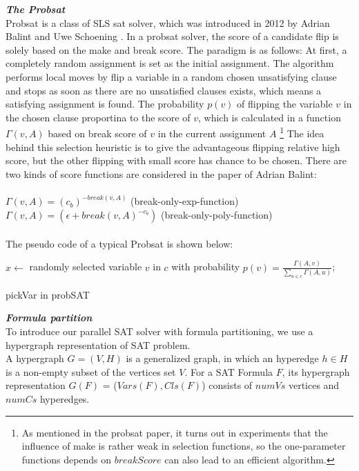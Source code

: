 \documentclass[12pt,a4paper,twoside]{scrartcl}
\numberwithin{equation}{section}
\begin{document}
\emph{\textbf{The Probsat}}\\
Probsat is a class of SLS sat solver, which was introduced in 2012 by Adrian Balint and Uwe Schoening \cite{balint2016engineering}. In a probsat solver, the score of a candidate flip is solely based on the make and break score. The paradigm is as follows: At first, a completely random assignment is set as the initial assignment. The algorithm performs local moves by flip a variable in a random chosen unsatisfying clause and stops as soon as there are no unsatisfied clauses exists, which means a satisfying assignment is found. The probability $p(v)$ of flipping the variable $v$ in the chosen clause proportina to the score of $v$, which is calculated in a function $\Gamma(v,A)$ based on break score of $v$ in the current assignment $A$ \footnote{As mentioned in the probsat paper, it turns out in experiments that the influence of make is rather weak in selection functions, so the one-parameter functions depends on $breakScore$ can also lead to an efficient algorithm.} The idea behind this selection heuristic is to give the advantageous flipping relative high score, but the other flipping with small score has chance to be chosen.  There are two kinds of score functions are considered in the paper of Adrian Balint: \\
\\
$\Gamma(v,A) = (c_b)^{-break(v,A)}$ (break-only-exp-function) \\
$\Gamma(v,A)=(\epsilon +break(v,A)^{-c_b})$  (break-only-poly-function)\\ 
\\
\clearpage
The pseudo code of a typical Probsat is shown below:\\
\begin{algorithm}[H]
  $x \leftarrow$ randomly selected  variable $v$ in $c$ with probability $p(v) =\frac{\Gamma(A,v)}{\sum_{u \in c}\Gamma(A,u)}$; 
 \caption{pickVar in probSAT}
\end{algorithm} 
\emph{\textbf{Formula partition}}\\
To introduce our parallel SAT solver with formula partitioning, we use a  hypergraph representation of SAT problem. \\
A hypergraph $G = (V,H)$ is a generalized graph, in which an hyperedge $h \in H$ is a non-empty subset of the vertices set $V$. For a SAT Formula $F$, its hypergraph representation $G(F)$ = ($Vars(F),Cls(F)$) consists of $numVs$ vertices and $numCs$ hyperedges. 
\end{document}
